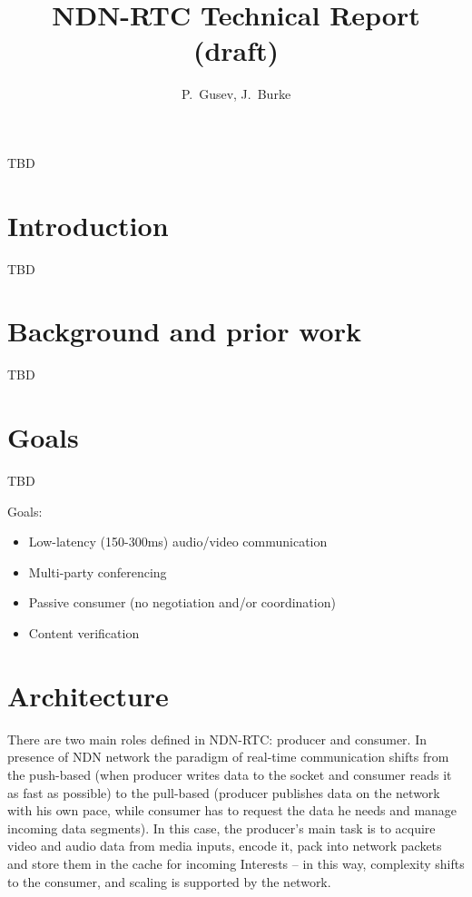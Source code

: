 \documentclass[10pt]{proc}
\author{P.~Gusev, J.~Burke}
\title{NDN-RTC Technical Report (draft)}
\begin{document}
\maketitle

\abstract
TBD

\section{Introduction}
TBD

\section{Background and prior work}
TBD

\section{Goals}
TBD

Goals:

\begin{itemize}
\item Low-latency (150-300ms) audio/video communication
\item Multi-party conferencing
\item Passive consumer (no negotiation and/or coordination)
\item Content verification
\end{itemize}

\section{Architecture}
There are two main roles defined in NDN-RTC: producer and consumer. In presence of NDN network the paradigm of real-time communication shifts from the push-based (when producer writes data to the socket and consumer reads it as fast as possible) to the pull-based (producer publishes data on the network with his own pace, while consumer has to request the data he needs and manage incoming data segments).
In this case, the producer’s main task is to acquire video and audio data from media inputs, encode it, pack into network packets and store them in the cache for incoming Interests – in this way, complexity shifts to the consumer, and scaling is supported by the network.
\end{document}
